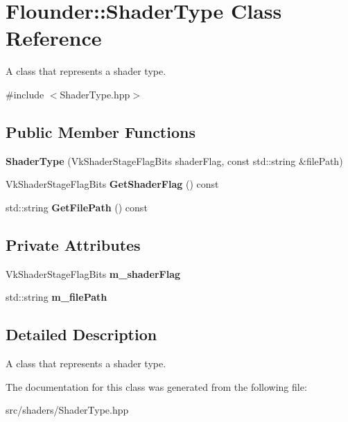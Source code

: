 \hypertarget{class_flounder_1_1_shader_type}{}\section{Flounder\+:\+:Shader\+Type Class Reference}
\label{class_flounder_1_1_shader_type}


A class that represents a shader type.  




{\ttfamily \#include $<$Shader\+Type.\+hpp$>$}

\subsection*{Public Member Functions}
\begin{DoxyCompactItemize}
\item 
\mbox{\label{class_flounder_1_1_shader_type_a5d7791429555af55bc0f073cc7ce6b27}} 
{\bfseries Shader\+Type} (Vk\+Shader\+Stage\+Flag\+Bits shader\+Flag, const std\+::string \&file\+Path)
\item 
\mbox{\label{class_flounder_1_1_shader_type_a4db5d11e004eeb98a2bcd4f6dad79e02}} 
Vk\+Shader\+Stage\+Flag\+Bits {\bfseries Get\+Shader\+Flag} () const
\item 
\mbox{\label{class_flounder_1_1_shader_type_a7f1f33566487cda4f522032b5c6f25d8}} 
std\+::string {\bfseries Get\+File\+Path} () const
\end{DoxyCompactItemize}
\subsection*{Private Attributes}
\begin{DoxyCompactItemize}
\item 
\mbox{\label{class_flounder_1_1_shader_type_af2d11714a177bc2e576ecdbddca35859}} 
Vk\+Shader\+Stage\+Flag\+Bits {\bfseries m\+\_\+shader\+Flag}
\item 
\mbox{\label{class_flounder_1_1_shader_type_a607909b072a331301d5aef4ceccb864b}} 
std\+::string {\bfseries m\+\_\+file\+Path}
\end{DoxyCompactItemize}


\subsection{Detailed Description}
A class that represents a shader type. 



The documentation for this class was generated from the following file\+:\begin{DoxyCompactItemize}
\item 
src/shaders/Shader\+Type.\+hpp\end{DoxyCompactItemize}
